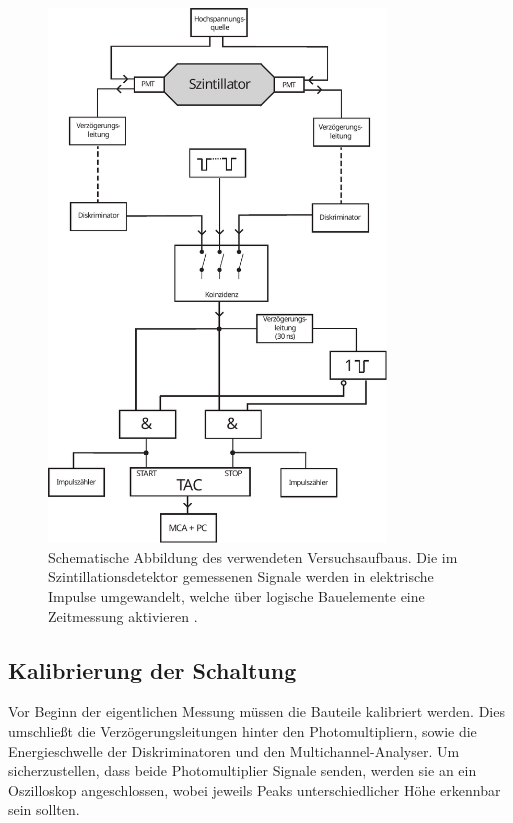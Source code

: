 \begin{figure}
    \centering
    \includegraphics[width=0.8\textwidth]{content/img/Abb_1.pdf}
    \caption{Schematische Abbildung des verwendeten Versuchsaufbaus.
    Die im Szintillationsdetektor gemessenen Signale werden in elektrische Impulse umgewandelt,
    welche über logische Bauelemente eine Zeitmessung aktivieren \cite{versuchsanleitung}.}
    \label{fig:versuchsaufbau}
\end{figure}


\subsection{Kalibrierung der Schaltung}

Vor Beginn der eigentlichen Messung müssen die Bauteile kalibriert werden.
Dies umschließt die Verzögerungsleitungen hinter den Photomultipliern,
sowie die Energieschwelle der Diskriminatoren und den Multichannel-Analyser.
Um sicherzustellen,
dass beide Photomultiplier Signale senden,
werden sie an ein Oszilloskop angeschlossen,
wobei jeweils Peaks unterschiedlicher Höhe erkennbar sein sollten.


